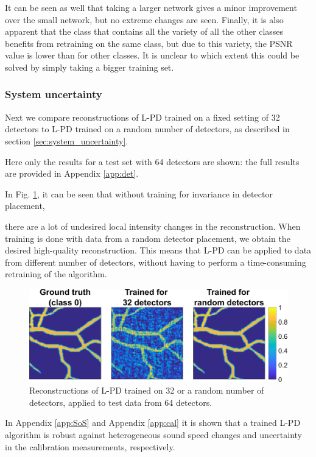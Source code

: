 \documentclass[journal]{IEEEtran}
\newcommand{\hl}[1]{\cbcolor{red}\begin{changebar}{\color{red} #1}\end{changebar}}
\begin{document}
It can be seen as well that taking a larger network gives a minor improvement over the small network, but no extreme changes are seen. Finally, it is also apparent that the class that contains all the variety of all the other classes benefits from retraining on the same class, but due to this variety, the PSNR value is lower than for other classes. It is unclear to which extent this could be solved by simply taking a bigger training set. 

\subsubsection{System uncertainty} Next we compare reconstructions of L-PD trained on a fixed setting of 32 detectors to L-PD trained on a random number of detectors, as described in section \ref{sec:system_uncertainty}. \hl{Here only the results for a test set with 64 detectors are shown: the full results are provided in Appendix \ref{app:det}.} In Fig. \ref{fig:system_changes_result}, it can be seen that without training for invariance in detector placement, \hl{there are a lot of undesired local intensity changes in the reconstruction. When training is done with data from a random detector placement, we obtain the desired high-quality reconstruction. This means that L-PD can be applied to data from different number of detectors, without having to perform a time-consuming retraining of the algorithm. }

\begin{figure}[ht!]
\centering
\includegraphics[width=\linewidth]{images/system_changes_im.png}
\caption{Reconstructions of L-PD trained on 32 or a random number of detectors, applied to test data from 64 detectors.}
\label{fig:system_changes_result}
\end{figure}

\hl{In Appendix \ref{app:SoS} and Appendix \ref{app:cal} it is shown that a trained L-PD algorithm is robust against heterogeneous sound speed changes and uncertainty in the calibration measurements, respectively.}
\end{document}
